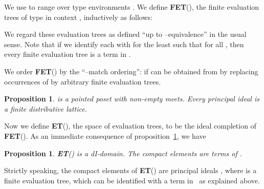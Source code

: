 \documentclass[11pt]{article}
\newtheorem{proposition}[theorem]{Proposition}
\newcommand{\pcfc}{\mbox{}}
\newcommand{\finevalT}[2]{\mbox{{\bf FET}()}}
\newcommand{\twotrans}[2]{\mbox{#1#2}}
\newcommand{\evalT}[2]{\mbox{{\bf ET}()}}
\begin{document}
We use  to range over type environments .  We define \finevalT{\Gamma}{T}, the finite
evaluation trees of type  in context , inductively as
follows:

We regard these evaluation trees as defined ``up to
--equivalence'' in the usual sense. Note that if we
identify each  with  for the least  such that  for all , then every finite evaluation tree is a term in \pcfc.

We order \finevalT{\Gamma}{T} by the ``--match ordering'':
 if  can be obtained from  by replacing
occurrences of  by arbitrary finite evaluation trees.

\begin{proposition}\label{A}
 is a pointed poset with non-empty
meets.  Every principal ideal is a finite distributive lattice.
\end{proposition}

Now we define \evalT{\Gamma}{T}, the space of evaluation trees, to be
the ideal completion of \finevalT{\Gamma}{T}.  As an immediate
consequence of proposition~\ref{A}, we have

\begin{proposition}
\evalT{\Gamma}{T} is a dI-domain.  The compact elements are terms of
\pcfc.
\end{proposition}
Strictly speaking, the compact elements of \evalT{\Gamma}{T} are
principal ideals , where  is a finite evaluation
tree, which can be identified with a term in \pcfc\ as explained
above.
\end{document}
